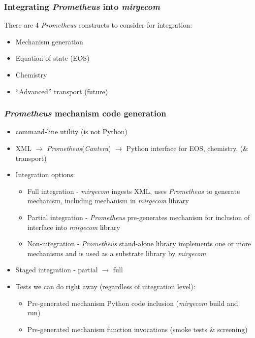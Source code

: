 \def\CC{{C\nolinebreak[4]\hspace{-.05em}\raisebox{.4ex}{\tiny\bf ++}}}

\begin{frame}\frametitle{Integrating \textit{Prometheus} into \textit{mirgecom}}
There are 4 \textit{Prometheus} constructs to consider for integration:
\begin{itemize}
\item Mechanism generation
\item Equation of state (EOS)
\item Chemistry
\item ``Advanced'' transport (future)
\end{itemize}
\end{frame}

\begin{frame}\frametitle{\textit{Prometheus} mechanism code generation}
\begin{multicols}{2}
\begin{itemize}
   \item {} command-line utility (is not Python)
   \item XML $\rightarrow$ \textit{Prometheus}(\textit{Cantera}) $\rightarrow$ Python interface for EOS, chemistry, (\& transport)
\end{itemize}
\begin{itemize}
   \item Integration options:
   \begin{itemize}
      \item Full integration - \textit{mirgecom} ingests XML, uses \textit{Prometheus} to generate mechanism, including mechanism in \textit{mirgecom} library
      \item Partial integration - \textit{Prometheus} pre-generates mechanism for inclusion of interface into \textit{mirgecom} library
      \item Non-integration - \textit{Prometheus} stand-alone library implements one or more mechanisms and is used as a substrate library by \textit{mirgecom} 
   \end{itemize}
    \item Staged integration - partial $\rightarrow$ full
   \item Tests we can do right away (regardless of integration level):
   \begin{itemize}
      \item Pre-generated mechanism Python code inclusion (\textit{mirgecom} build and run)
      \item Pre-generated mechanism function invocations (smoke tests \& screening)
   \end{itemize}
\end{itemize}
\end{multicols}
\end{frame}

